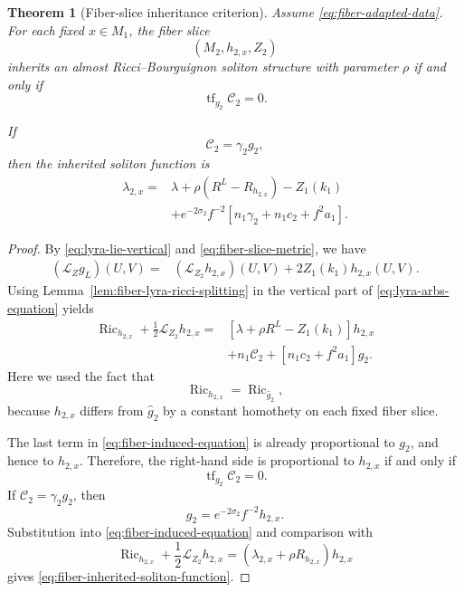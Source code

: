 \documentclass[a4paper,11pt]{article}
\theoremstyle{plain}
\newtheorem{theorem}{Theorem}[section]
\numberwithin{equation}{section}
\begin{document}
\begin{theorem}[Fiber-slice inheritance criterion]
	\label{thm:fiber-inheritance}
	Assume \eqref{eq:fiber-adapted-data}. For each fixed
	\(x\in M_{1}\), the fiber slice
	\[
	\left(
	M_{2},
	h_{2,x},
	Z_{2}
	\right)
	\]
	inherits an almost Ricci--Bourguignon soliton structure with
	parameter \(\rho\) if and only if
	\begin{equation}
		\operatorname{tf}_{g_{2}}\mathcal C_{2}
		=
		0.
		\label{eq:fiber-inheritance-condition}
	\end{equation}
	
	If
	\begin{equation}
		\mathcal C_{2}
		=
		\gamma_{2}g_{2},
		\label{eq:fiber-inheritance-gamma}
	\end{equation}
	then the inherited soliton function is
	\begin{align}
		\lambda_{2,x}
		={}&
		\lambda
		+
		\rho
		\left(
		R^{L}-R_{h_{2,x}}
		\right)
		-
		Z_{1}(k_{1})
		\nonumber\\
		&+
		e^{-2\sigma_{2}}f^{-2}
		\left[
		n_{1}\gamma_{2}
		+
		n_{1}c_{2}
		+
		f^{2}a_{1}
		\right].
		\label{eq:fiber-inherited-soliton-function}
	\end{align}
\end{theorem}

\begin{proof}
	By \eqref{eq:lyra-lie-vertical} and
	\eqref{eq:fiber-slice-metric}, we have
	\begin{align}
		(\mathcal L_{Z}g_{L})(U,V)
		={}&
		(\mathcal L_{Z_{2}}h_{2,x})(U,V)
		+
		2Z_{1}(k_{1})h_{2,x}(U,V).
		\label{eq:fiber-lie-inheritance}
	\end{align}
	Using Lemma~\ref{lem:fiber-lyra-ricci-splitting} in the
	vertical part of \eqref{eq:lyra-arbs-equation} yields
	\begin{align}
		\operatorname{Ric}_{h_{2,x}}
		+
		\frac{1}{2}
		\mathcal L_{Z_{2}}h_{2,x}
		={}&
		\left[
		\lambda+\rho R^{L}
		-
		Z_{1}(k_{1})
		\right]h_{2,x}
		\nonumber\\
		&+
		n_{1}\mathcal C_{2}
		+
		\left[
		n_{1}c_{2}
		+
		f^{2}a_{1}
		\right]g_{2}.
		\label{eq:fiber-induced-equation}
	\end{align}
	Here we used the fact that
	\[
	\operatorname{Ric}_{h_{2,x}}
	=
	\operatorname{Ric}_{\widehat g_{2}},
	\]
	because \(h_{2,x}\) differs from \(\widehat g_{2}\) by a
	constant homothety on each fixed fiber slice.
	
	The last term in \eqref{eq:fiber-induced-equation} is already
	proportional to \(g_{2}\), and hence to \(h_{2,x}\). Therefore,
	the right-hand side is proportional to \(h_{2,x}\) if and only
	if
	\[
	\operatorname{tf}_{g_{2}}\mathcal C_{2}=0.
	\]
	If \(\mathcal C_{2}=\gamma_{2}g_{2}\), then
	\[
	g_{2}
	=
	e^{-2\sigma_{2}}f^{-2}h_{2,x}.
	\]
	Substitution into \eqref{eq:fiber-induced-equation} and
	comparison with
	\[
	\operatorname{Ric}_{h_{2,x}}
	+
	\frac{1}{2}\mathcal L_{Z_{2}}h_{2,x}
	=
	\left(
	\lambda_{2,x}
	+
	\rho R_{h_{2,x}}
	\right)h_{2,x}
	\]
	gives \eqref{eq:fiber-inherited-soliton-function}.
\end{proof}
\end{document}
